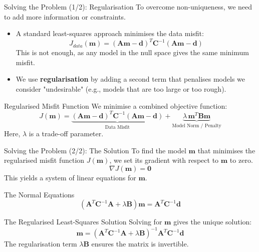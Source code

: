 \documentclass{beamer}
\begin{document}
\begin{frame}{Solving the Problem (1/2): Regularisation}
    To overcome non-uniqueness, we need to add more information or constraints.
    \begin{itemize}
        \item A standard least-squares approach minimises the data misfit:
        $$ J_{data}(\mathbf{m}) = (\mathbf{A}\mathbf{m}-\mathbf{d})^{T}\mathbf{C}^{-1}(\mathbf{A}\mathbf{m}-\mathbf{d}) $$
        This is not enough, as any model in the null space gives the same minimum misfit.
        \pause
        \item We use \textbf{regularisation} by adding a second term that penalises models we consider "undesirable" (e.g., models that are too large or too rough).
    \end{itemize}
    \begin{alertblock}{Regularised Misfit Function}
        We minimise a combined objective function:
        $$ J(\mathbf{m}) = \underbrace{(\mathbf{A}\mathbf{m}-\mathbf{d})^{T}\mathbf{C}^{-1}(\mathbf{A}\mathbf{m}-\mathbf{d})}_{\text{Data Misfit}} + \underbrace{\lambda \, \mathbf{m}^{T}\mathbf{B}\mathbf{m}}_{\text{Model Norm / Penalty}} $$
        Here, $ \lambda $ is a trade-off parameter.
    \end{alertblock}
\end{frame}

\begin{frame}{Solving the Problem (2/2): The Solution}
    To find the model $ \mathbf{m} $ that minimises the regularised misfit function $ J(\mathbf{m}) $, we set its gradient with respect to $ \mathbf{m} $ to zero.
    $$ \nabla J(\mathbf{m}) = \mathbf{0} $$
    \pause
    This yields a system of linear equations for $ \mathbf{m} $.
    \begin{block}{The Normal Equations}
        $$ (\mathbf{A}^{T}\mathbf{C}^{-1}\mathbf{A}+\lambda \mathbf{B})\mathbf{m} = \mathbf{A}^{T}\mathbf{C}^{-1}\mathbf{d} $$
    \end{block}
    \pause
    \begin{alertblock}{The Regularised Least-Squares Solution}
        Solving for $ \mathbf{m} $ gives the unique solution:
        $$ \mathbf{m}=(\mathbf{A}^{T}\mathbf{C}^{-1}\mathbf{A}+\lambda \mathbf{B})^{-1}\mathbf{A}^{T}\mathbf{C}^{-1}\mathbf{d} $$
        The regularisation term $ \lambda\mathbf{B} $ ensures the matrix is invertible.
    \end{alertblock}
\end{frame}
\end{document}
